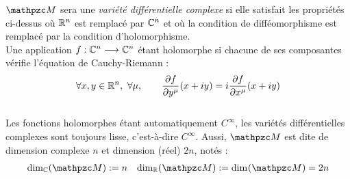$\manu$ sera une \emph{variété différentielle complexe} si elle satisfait les propriétés ci-dessus où $\mathbb{R}^n$ est remplacé par $\mathbb{C}^n$ et où la condition de difféomorphisme est remplacé par la condition d'holomorphisme. 
\\
Une application $f : \mathbb{C}^n\longrightarrow \mathbb{C}^n$ étant holomorphe si chacune de ses composantes vérifie l'équation de Cauchy-Riemann :
\[\forall x,y\in\R^n,\ \forall \mu,\qquad \frac{\partial f }{\partial y^\mu}(x+iy) = i \frac{\partial f }{\partial x^\mu}(x+iy)\]
\\
Les fonctions holomorphes étant automatiquement $C^\infty$, les variétés différentielles complexes sont toujours lisse, c'est-à-dire $C^\infty$. Aussi, $\manu$ est dite de dimension complexe $n$ et dimension (réel) $2n$, notés :
\begin{align}\label{eq:manuC-base_cano}
	\dim[\C](\manu) &\defeq n  &  \dim[\R] (\manu) \defeq \dim (\manu) = 2n
\end{align}
\\

